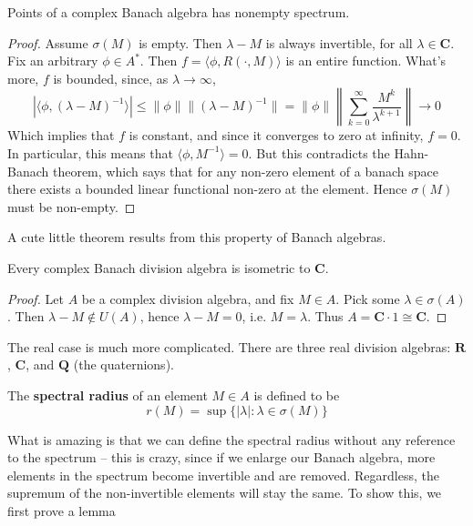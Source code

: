 \begin{theorem}
    Points of a complex Banach algebra has nonempty spectrum.
\end{theorem}
\begin{proof}
    Assume $\sigma(M)$ is empty. Then $\lambda - M$ is always invertible, for all $\lambda \in \mathbf{C}$. Fix an arbitrary $\phi \in A^*$. Then $f = \langle \phi, R(\cdot, M) \rangle$ is an entire function. What's more, $f$ is bounded, since, as $\lambda \to \infty$,
    \[ | \langle \phi, (\lambda - M)^{-1} \rangle | \leq \| \phi \| \| (\lambda - M)^{-1} \| = \| \phi \| \left\| \sum_{k = 0}^\infty \frac{M^k}{\lambda^{k+1}} \right\| \to 0 \]
    Which implies that $f$ is constant, and since it converges to zero at infinity, $f = 0$. In particular, this means that $\langle \phi, M^{-1} \rangle = 0$. But this contradicts the Hahn-Banach theorem, which says that for any non-zero element of a banach space there exists a bounded linear functional non-zero at the element. Hence $\sigma(M)$ must be non-empty.
\end{proof}

A cute little theorem results from this property of Banach algebras.

\begin{corollary}
    Every complex Banach division algebra is isometric to $\mathbf{C}$.
\end{corollary}
\begin{proof}
    Let $A$ be a complex division algebra, and fix $M \in A$. Pick some $\lambda \in \sigma(A)$. Then $\lambda - M \not \in U(A)$, hence $\lambda - M = 0$, i.e. $M = \lambda$. Thus $A = \mathbf{C} \cdot 1 \cong \mathbf{C}$.
\end{proof}

The real case is much more complicated. There are three real division algebras: $\mathbf{R}$, $\mathbf{C}$, and $\mathbf{Q}$ (the quaternions).

\begin{definition}
    The {\bf spectral radius} of an element $M \in A$ is defined to be
    \[ r(M) = \sup \{ |\lambda| : \lambda \in \sigma(M) \} \]
\end{definition}

What is amazing is that we can define the spectral radius without any reference to the spectrum -- this is crazy, since if we enlarge our Banach algebra, more elements in the spectrum become invertible and are removed. Regardless, the supremum of the non-invertible elements will stay the same. To show this, we first prove a lemma

